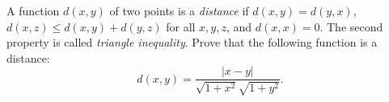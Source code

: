 A function $d(x, y)$ of two points is a \emph{distance} if $d(x, y) = d(y, x)$, $d(x, z) \leq d(x, y) + d(y, z)$ for all $x, y, z$, and $d(x, x) = 0$. The second property is called \emph{triangle inequality}. Prove that the following function is a distance:
\[ d(x, y) = \frac{|x - y|}{\sqrt{1 + x^2}\sqrt{1 + y^2}}. \]
